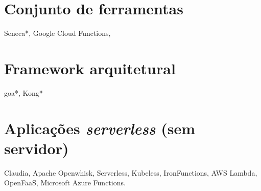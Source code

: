 \section{Conjunto de ferramentas}
Seneca*, Google Cloud Functions,

\section{Framework arquitetural}
goa*, Kong*

\section{Aplicações \emph{serverless} (sem servidor)}
Claudia, Apache Openwhisk, Serverless, Kubeless, IronFunctions, AWS Lambda, OpenFaaS, Microsoft Azure Functions.

